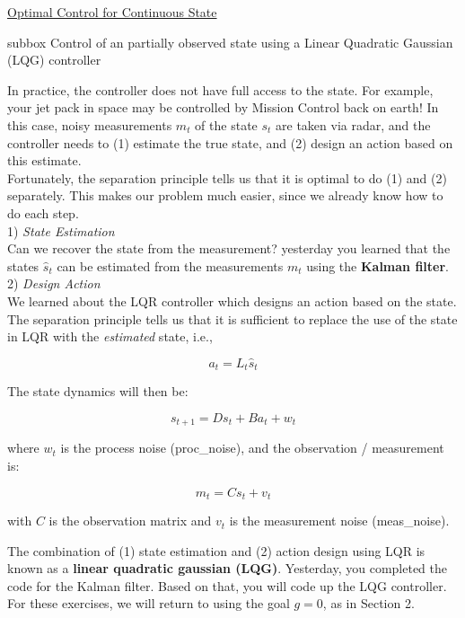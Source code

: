 \begin{textbox}{\href{https://compneuro.neuromatch.io/tutorials/W3D3_OptimalControl/student/W3D3_Tutorial2.html}{Optimal Control for Continuous State}}
\begin{subbox}{subbox}{  Control of an partially observed state using a Linear Quadratic Gaussian (LQG) controller}
\scriptsize

In practice, the controller does not have full access to the state. For example, your jet pack in space may be controlled by Mission Control back on earth!  In this case, noisy measurements $m_t$ of the state $s_t$ are taken via radar, and the controller needs to (1) estimate the true state, and (2) design an action based on this estimate. \\

Fortunately, the separation principle tells us that it is optimal to do (1) and (2) separately. This makes our problem much easier, since we already know how to do each step.  \\

1) \textit{State Estimation}\\  
Can we recover the state from the measurement? 
yesterday you learned that the states $\hat{s}_t$ can be estimated from the measurements $m_t$ using the \textbf{Kalman filter}. \\

2) \textit{Design Action}  \\
We learned about the LQR controller which designs an action based on the state. The separation principle tells us that it is sufficient to replace the use of the state in LQR with the \textit{estimated} state, i.e.,

\begin{equation}
a_t = L_t \hat s_t
\end{equation}

The state dynamics will then be:

\begin{equation}
s_{t+1} = D s_t + B a_t + w_t
\end{equation}

where $w_t$ is the process noise (proc_noise), and the observation / measurement is:

\begin{equation}
m_t = C s_t + v_t
\end{equation}

with $C$ is the observation matrix and $v_t$ is the measurement noise (meas_noise).

The combination of (1) state estimation and (2) action design using LQR is known as a \textbf{linear quadratic gaussian (LQG)}. Yesterday, you completed the code for the Kalman filter. Based on that, you will code up the LQG controller. 
For these exercises, we will return to using the goal $g=0$, as in Section 2.

\end{subbox}

\end{textbox}
